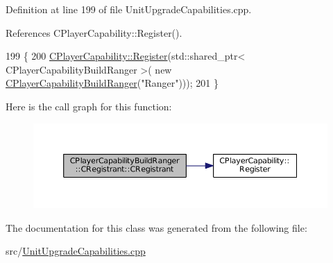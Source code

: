 Definition at line 199 of file Unit\+Upgrade\+Capabilities.\+cpp.



References C\+Player\+Capability\+::\+Register().


\begin{DoxyCode}
199                                                     \{
200     \hyperlink{classCPlayerCapability_a7e298018dcde2684451add3cfff065f7}{CPlayerCapability::Register}(std::shared\_ptr< CPlayerCapabilityBuildRanger >(\textcolor{keyword}{
      new} \hyperlink{classCPlayerCapabilityBuildRanger_adb3602c8f527157dcd0c9289272a9aa0}{CPlayerCapabilityBuildRanger}(\textcolor{stringliteral}{"Ranger"})));   
201 \}
\end{DoxyCode}
Here is the call graph for this function\+:\nopagebreak
\begin{figure}[H]
\begin{center}
\leavevmode
\includegraphics[width=350pt]{classCPlayerCapabilityBuildRanger_1_1CRegistrant_a8fb4327aa5143d6818e2451fc6ff2e9c_cgraph}
\end{center}
\end{figure}


The documentation for this class was generated from the following file\+:\begin{DoxyCompactItemize}
\item 
src/\hyperlink{UnitUpgradeCapabilities_8cpp}{Unit\+Upgrade\+Capabilities.\+cpp}\end{DoxyCompactItemize}
